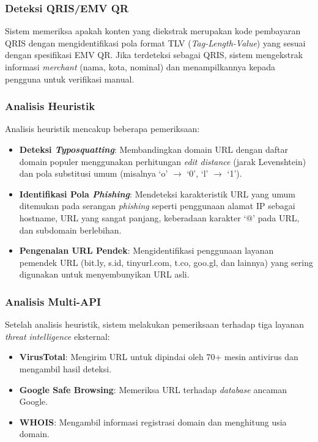 \documentclass[conference]{IEEEtran}
\begin{document}
\subsubsection{Deteksi QRIS/EMV QR}
Sistem memeriksa apakah konten yang diekstrak merupakan kode pembayaran QRIS dengan mengidentifikasi pola format TLV (\textit{Tag-Length-Value}) yang sesuai dengan spesifikasi EMV QR. Jika terdeteksi sebagai QRIS, sistem mengekstrak informasi \textit{merchant} (nama, kota, nominal) dan menampilkannya kepada pengguna untuk verifikasi manual.

\subsubsection{Analisis Heuristik}
Analisis heuristik mencakup beberapa pemeriksaan:
\begin{itemize}
    \item \textbf{Deteksi \textit{Typosquatting}}: Membandingkan domain URL dengan daftar domain populer menggunakan perhitungan \textit{edit distance} (jarak Levenshtein) dan pola substitusi umum (misalnya `o' $\rightarrow$ `0', `l' $\rightarrow$ `1').
    \item \textbf{Identifikasi Pola \textit{Phishing}}: Mendeteksi karakteristik URL yang umum ditemukan pada serangan \textit{phishing} seperti penggunaan alamat IP sebagai hostname, URL yang sangat panjang, keberadaan karakter `@' pada URL, dan subdomain berlebihan.
    \item \textbf{Pengenalan URL Pendek}: Mengidentifikasi penggunaan layanan pemendek URL (bit.ly, s.id, tinyurl.com, t.co, goo.gl, dan lainnya) yang sering digunakan untuk menyembunyikan URL asli.
\end{itemize}

\subsubsection{Analisis Multi-API}
Setelah analisis heuristik, sistem melakukan pemeriksaan terhadap tiga layanan \textit{threat intelligence} eksternal:
\begin{itemize}
    \item \textbf{VirusTotal}: Mengirim URL untuk dipindai oleh 70+ mesin antivirus dan mengambil hasil deteksi.
    \item \textbf{Google Safe Browsing}: Memeriksa URL terhadap \textit{database} ancaman Google.
    \item \textbf{WHOIS}: Mengambil informasi registrasi domain dan menghitung usia domain.
\end{itemize}
\end{document}

